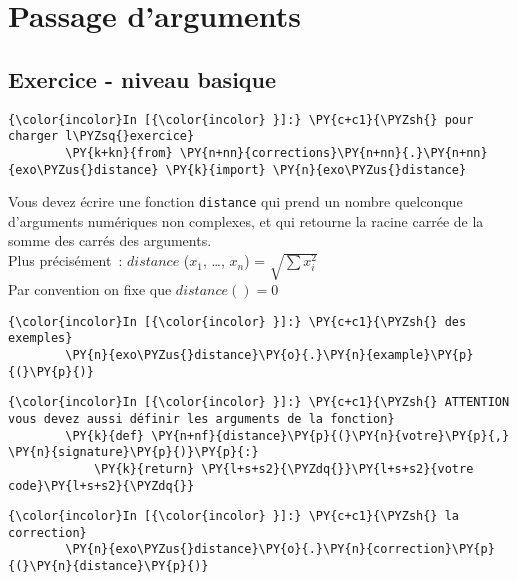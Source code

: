     \hypertarget{passage-darguments}{%
\section{Passage d'arguments}\label{passage-darguments}}

    \hypertarget{exercice---niveau-basique}{%
\subsection{Exercice - niveau basique}\label{exercice---niveau-basique}}

    \begin{Verbatim}[commandchars=\\\{\}]
{\color{incolor}In [{\color{incolor} }]:} \PY{c+c1}{\PYZsh{} pour charger l\PYZsq{}exercice}
        \PY{k+kn}{from} \PY{n+nn}{corrections}\PY{n+nn}{.}\PY{n+nn}{exo\PYZus{}distance} \PY{k}{import} \PY{n}{exo\PYZus{}distance}
\end{Verbatim}


    Vous devez écrire une fonction \texttt{distance} qui prend un nombre
quelconque d'arguments numériques non complexes, et qui retourne la
racine carrée de la somme des carrés des arguments.\\

Plus précisément~: \(distance\) (\(x_1\), \ldots{}, \(x_n\)) =
\(\sqrt{\sum x_i^2}\)\\

Par convention on fixe que \(distance() = 0\)

    \begin{Verbatim}[commandchars=\\\{\}]
{\color{incolor}In [{\color{incolor} }]:} \PY{c+c1}{\PYZsh{} des exemples}
        \PY{n}{exo\PYZus{}distance}\PY{o}{.}\PY{n}{example}\PY{p}{(}\PY{p}{)}
\end{Verbatim}


    \begin{Verbatim}[commandchars=\\\{\}]
{\color{incolor}In [{\color{incolor} }]:} \PY{c+c1}{\PYZsh{} ATTENTION vous devez aussi définir les arguments de la fonction}
        \PY{k}{def} \PY{n+nf}{distance}\PY{p}{(}\PY{n}{votre}\PY{p}{,} \PY{n}{signature}\PY{p}{)}\PY{p}{:}
            \PY{k}{return} \PY{l+s+s2}{\PYZdq{}}\PY{l+s+s2}{votre code}\PY{l+s+s2}{\PYZdq{}}
\end{Verbatim}


    \begin{Verbatim}[commandchars=\\\{\}]
{\color{incolor}In [{\color{incolor} }]:} \PY{c+c1}{\PYZsh{} la correction}
        \PY{n}{exo\PYZus{}distance}\PY{o}{.}\PY{n}{correction}\PY{p}{(}\PY{n}{distance}\PY{p}{)}
\end{Verbatim}


